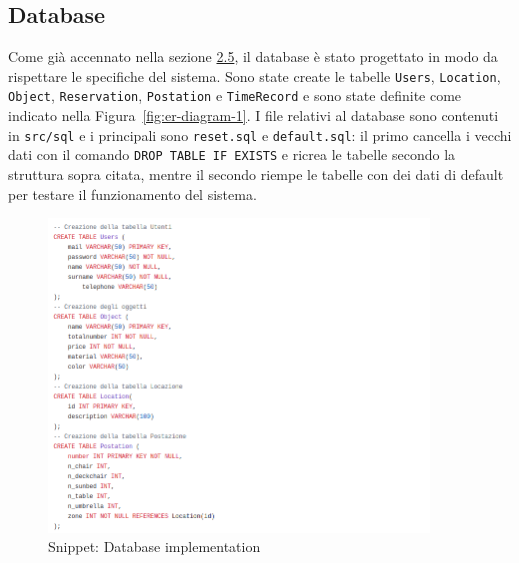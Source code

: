 \documentclass{article}
\begin{document}
{\subsection{Database}\label{subsec:Database}
Come già accennato nella sezione \hyperref[subsec:ERdiagram]{2.5}, il database è stato progettato in modo da rispettare le specifiche del sistema.
            Sono state create le tabelle \texttt{Users}, \texttt{Location}, \texttt{Object}, \texttt{Reservation}, \texttt{Postation} e \texttt{TimeRecord}
            e sono state definite come indicato nella Figura~\ref{fig:er-diagram-1}.
            I file relativi al database sono contenuti in \texttt{src/sql} e i principali sono \texttt{reset.sql} e \texttt{default.sql}:
            il primo cancella i vecchi dati con il comando \texttt{DROP TABLE IF EXISTS} e ricrea le tabelle secondo la struttura sopra citata,
            mentre il secondo riempe le tabelle con dei dati di default per testare il funzionamento del sistema.
\begin{figure}[H]
                \centering
                \includegraphics[width=0.9\textwidth]{Images/Snippets/Database.png}
                \captionsetup{labelformat=empty,labelsep=none}
                \caption{Snippet: Database implementation}
                \label{fig:snippetDatabase}
            \end{figure}
}
\end{document}
